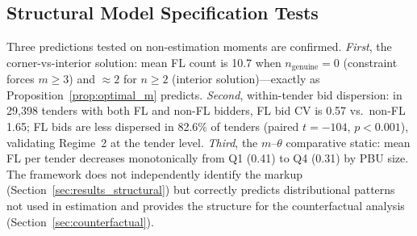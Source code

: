 
\subsection{Structural Model Specification Tests}
\label{sec:spec_tests}

Three predictions tested on non-estimation moments are confirmed.
\emph{First}, the corner-vs-interior solution: mean FL count is 10.7
when $n_{\text{genuine}} = 0$ (constraint forces $m \geq 3$) and
$\approx 2$ for $n \geq 2$ (interior solution)---exactly as
Proposition~\ref{prop:optimal_m} predicts.
\emph{Second}, within-tender bid dispersion: in 29,398 tenders with
both FL and non-FL bidders, FL bid CV is 0.57 vs.\ non-FL 1.65; FL
bids are less dispersed in 82.6\% of tenders (paired $t = -104$,
$p < 0.001$), validating Regime~2 at the tender level.
\emph{Third}, the $m$--$\theta$ comparative static: mean FL per tender
decreases monotonically from Q1 (0.41) to Q4 (0.31) by PBU size.
The framework does not independently identify the markup
(Section~\ref{sec:results_structural}) but correctly predicts
distributional patterns not used in estimation and provides the
structure for the counterfactual analysis
(Section~\ref{sec:counterfactual}).
